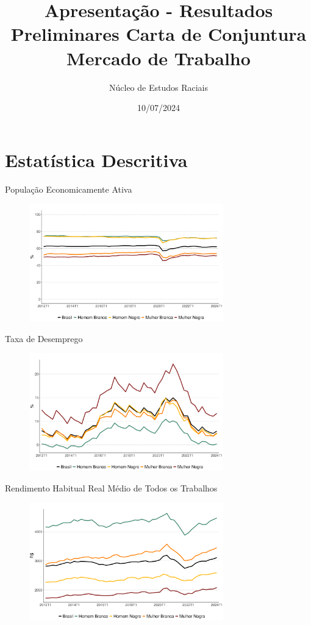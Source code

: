 \documentclass[10pt, xcolor=x11names,compress]{beamer}
\author{Núcleo de Estudos Raciais}
\title{Apresentação - Resultados Preliminares Carta de Conjuntura Mercado de Trabalho}
\institute{Insper}\date{10/07/2024}
\begin{document}
	\begin{frame}
		\titlepage
	\end{frame}
	
	
	\section{Estatística Descritiva} 
	\begin{frame}{População Economicamente Ativa}
		\begin{figure}
			\centering
			\includegraphics[width = 0.75\textwidth]{figures_output/pea_br_gen_raca.pdf}
		\end{figure}
	\end{frame}			
	
	
	\begin{frame}{Taxa de Desemprego}
		\begin{figure}
			\centering
			\includegraphics[width = 0.75\textwidth]{figures_output/unemp_br_gen_raca.pdf}
		\end{figure}
	\end{frame}			
	
	
	\begin{frame}{Rendimento Habitual Real Médio de Todos os Trabalhos}
		\begin{figure}
			\centering
			\includegraphics[width = 0.75\textwidth]{figures_output/rendimento_habitual_br_gen_raca.pdf}
		\end{figure}
	\end{frame}
	
\end{document}
